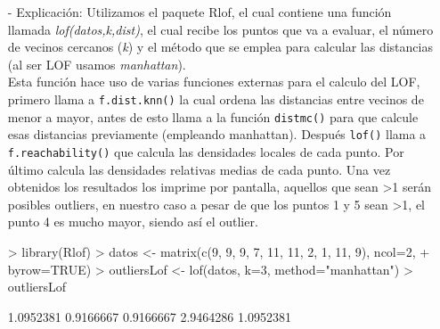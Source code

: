 \documentclass[a4paper, 12pt]{article}
\begin{document}
\begin{itemize}
\begin{itemize}
				\item[-] Explicación: Utilizamos el paquete Rlof, el cual contiene una función llamada \emph{lof(datos,k,dist)}, el cual recibe los puntos que va a evaluar, el número de vecinos cercanos (\emph{k}) y el método que se emplea para calcular las distancias (al ser LOF usamos \emph{manhattan}). \\
				Esta función hace uso de varias funciones externas para el calculo del LOF, primero llama a \texttt{f.dist.knn()} la cual ordena las distancias entre vecinos de menor a mayor, antes de esto llama a la función \texttt{distmc()} para que calcule esas distancias previamente (empleando manhattan). Después \texttt{lof()} llama a \texttt{f.reachability()} que calcula las densidades locales de cada punto. Por último calcula las densidades relativas medias de cada punto. Una vez obtenidos los resultados los imprime por pantalla, aquellos que sean >1 serán posibles outliers, en nuestro caso a pesar de que los puntos 1 y 5 sean >1, el punto 4 es mucho mayor, siendo así el outlier.\\ 
\begin{Schunk}
\begin{Sinput}
> library(Rlof)
> datos <- matrix(c(9, 9, 9, 7, 11, 11, 2, 1, 11, 9), ncol=2, 
+ byrow=TRUE)
> outliersLof <- lof(datos, k=3, method="manhattan")
> outliersLof
\end{Sinput}
\begin{Soutput}
[1] 1.0952381 0.9166667 0.9166667 2.9464286 1.0952381
\end{Soutput}
\end{Schunk}
			\end{itemize}
		\end{itemize}   
	
\end{document}
